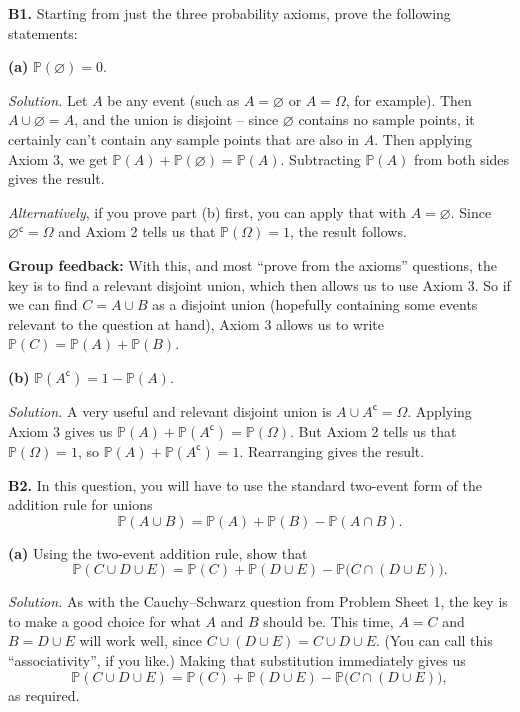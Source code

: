 \documentclass[
  a4paper,
]{book}
\theoremstyle{definition}
\theoremstyle{definition}
\theoremstyle{definition}
\theoremstyle{definition}
\theoremstyle{remark}
\begin{document}
\textbf{B1.} Starting from just the three probability axioms, prove the following statements:

\textbf{(a)} \(\mathbb P(\varnothing) = 0\).

\begin{myanswers}
\emph{Solution.} Let \(A\) be any event (such as \(A = \varnothing\) or \(A = \Omega\), for example). Then \(A \cup \varnothing = A\), and the union is disjoint -- since \(\varnothing\) contains no sample points, it certainly can't contain any sample points that are also in \(A\). Then applying Axiom 3, we get \(\mathbb P(A) + \mathbb P(\varnothing) = \mathbb P(A)\). Subtracting \(\mathbb P(A)\) from both sides gives the result.

\emph{Alternatively}, if you prove part (b) first, you can apply that with \(A = \varnothing\). Since \(\varnothing^\mathsf{c}= \Omega\) and Axiom 2 tells us that \(\mathbb P(\Omega) = 1\), the result follows.

\textbf{Group feedback:} With this, and most ``prove from the axioms'' questions, the key is to find a relevant disjoint union, which then allows us to use Axiom 3. So if we can find \(C = A \cup B\) as a disjoint union (hopefully containing some events relevant to the question at hand), Axiom 3 allows us to write \(\mathbb P(C) = \mathbb P(A) + \mathbb P(B)\).

\end{myanswers}

\textbf{(b)} \(\mathbb P(A^\mathsf{c}) = 1 - \mathbb P(A)\).

\begin{myanswers}
\emph{Solution.} A very useful and relevant disjoint union is \(A \cup A^\mathsf{c}= \Omega\). Applying Axiom 3 gives us \(\mathbb P(A) + \mathbb P(A^\mathsf{c}) = \mathbb P(\Omega)\). But Axiom 2 tells us that \(\mathbb P(\Omega) = 1\), so \(\mathbb P(A) + \mathbb P(A^\mathsf{c}) = 1\). Rearranging gives the result.

\end{myanswers}

\textbf{B2.} In this question, you will have to use the standard two-event form of the addition rule for unions
\[ \mathbb P(A \cup B) = \mathbb P(A) + \mathbb P(B) - \mathbb P(A \cap B) . \]

\textbf{(a)} Using the two-event addition rule, show that
\[ \mathbb P(C \cup D \cup E) = \mathbb P(C) + \mathbb P(D \cup E) - \mathbb P\big(C \cap (D \cup E)\big).  \]

\begin{myanswers}
\emph{Solution.} As with the Cauchy--Schwarz question from Problem Sheet 1, the key is to make a good choice for what \(A\) and \(B\) should be. This time, \(A = C\) and \(B = D \cup E\) will work well, since \(C \cup (D \cup E) = C \cup D \cup E\). (You can call this ``associativity'', if you like.) Making that substitution immediately gives us
\[ \mathbb P(C \cup D \cup E) = \mathbb P(C) + \mathbb P(D \cup E) - \mathbb P\big(C \cap (D \cup E)\big) ,  \]
as required.

\end{myanswers}
\end{document}
